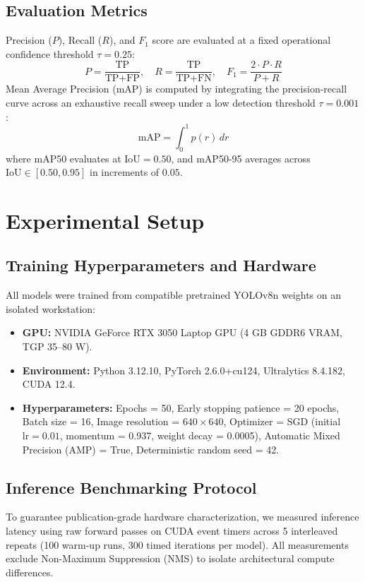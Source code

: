 \documentclass[conference]{IEEEtran}
\begin{document}
\subsection{Evaluation Metrics}
Precision ($P$), Recall ($R$), and $F_1$ score are evaluated at a fixed operational confidence threshold $\tau = 0.25$:
\begin{equation}
P = \frac{\text{TP}}{\text{TP} + \text{FP}}, \quad R = \frac{\text{TP}}{\text{TP} + \text{FN}}, \quad F_1 = \frac{2 \cdot P \cdot R}{P + R}
\end{equation}
Mean Average Precision (mAP) is computed by integrating the precision-recall curve across an exhaustive recall sweep under a low detection threshold $\tau = 0.001$:
\begin{equation}
\text{mAP} = \int_{0}^{1} p(r) \, dr
\end{equation}
where mAP50 evaluates at $\text{IoU} = 0.50$, and mAP50-95 averages across $\text{IoU} \in [0.50, 0.95]$ in increments of $0.05$.

\section{Experimental Setup}

\subsection{Training Hyperparameters and Hardware}
All models were trained from compatible pretrained YOLOv8n weights on an isolated workstation:
\begin{itemize}
    \item \textbf{GPU:} NVIDIA GeForce RTX 3050 Laptop GPU (4 GB GDDR6 VRAM, TGP 35--80 W).
    \item \textbf{Environment:} Python 3.12.10, PyTorch 2.6.0+cu124, Ultralytics 8.4.182, CUDA 12.4.
    \item \textbf{Hyperparameters:} Epochs = 50, Early stopping patience = 20 epochs, Batch size = 16, Image resolution = $640 \times 640$, Optimizer = SGD (initial $\text{lr} = 0.01$, momentum = 0.937, weight decay = 0.0005), Automatic Mixed Precision (AMP) = True, Deterministic random seed = 42.
\end{itemize}

\subsection{Inference Benchmarking Protocol}
To guarantee publication-grade hardware characterization, we measured inference latency using raw forward passes on CUDA event timers across 5 interleaved repeats (100 warm-up runs, 300 timed iterations per model). All measurements exclude Non-Maximum Suppression (NMS) to isolate architectural compute differences.
\end{document}
